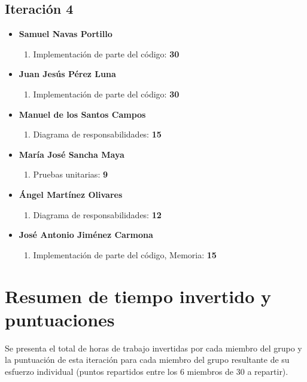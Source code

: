 \documentclass[11 pt]{book}
\begin{document}
		\subsection*{Iteración 4}
		    \begin{itemize}
			    \item \textbf {Samuel Navas Portillo}
				    \begin{enumerate}
					    \item Implementación de parte del código: \textbf{30}
				    \end{enumerate}
			    \item \textbf {Juan Jesús Pérez Luna}
				    \begin{enumerate}
					    \item Implementación de parte del código: \textbf{30}
				    \end{enumerate}
			    \item \textbf {Manuel de los Santos Campos}
				    \begin{enumerate}
					    \item Diagrama de responsabilidades: \textbf{15}
				    \end{enumerate}
			    \item \textbf {María José Sancha Maya}
				    \begin{enumerate}
					    \item Pruebas unitarias: \textbf{9}
				    \end{enumerate}
			    \item \textbf {Ángel Martínez Olivares}
				    \begin{enumerate}
					    \item Diagrama de responsabilidades: \textbf{12}
				    \end{enumerate}
			    \item \textbf {José Antonio Jiménez Carmona}
				    \begin{enumerate}
					    \item Implementación de parte del código, Memoria: \textbf{15}
				    \end{enumerate}
		    \end{itemize}
		    
	\section{Resumen de tiempo invertido y puntuaciones}
		Se presenta el total de horas de trabajo invertidas por cada miembro del grupo y la puntuación de esta iteración para cada miembro del grupo resultante de su esfuerzo individual (puntos repartidos entre los 6 miembros de 30 a repartir).\\
			
\end{document}
